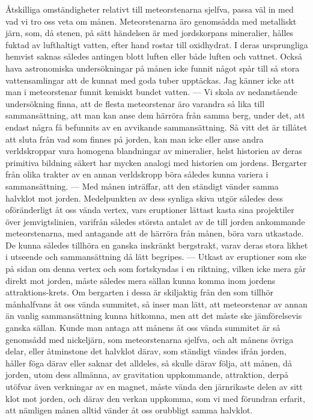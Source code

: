 \documentclass[a4paper, 12pt, oneside, swedish]{article}
\begin{document}
Åtskilliga omständigheter relativt till meteorstenarna sjelfva, passa väl in med vad vi tro oss veta om månen. Meteorstenarna äro genomsådda med metalliskt järn, som, då stenen, på sätt händelsen är med jordskorpans mineralier, hålles fuktad av lufthaltigt vatten, efter hand rostar till oxidhydrat. I deras ursprungliga hemvist saknas således antingen blott luften eller både luften och vattnet. Också hava astronomiska undersökningar på månen icke funnit något spår till så stora vattensamlingar att de kunnat med goda tuber upptäckas. Jag känner icke att man i meteorstenar funnit kemiskt bundet vatten. --- Vi skola av nedanstående undersökning finna, att de flesta meteorstenar äro varandra så lika till sammansättning, att man kan anse dem härröra från samma berg, under det, att endast några få befunnits av en avvikande sammansättning. Så vitt det är tillåtet att sluta från vad som finnes på jorden, kan man icke eller anse andra verldskroppar vara homogena blandningar av mineralier, helst historien av deras primitiva bildning säkert har mycken analogi med historien om jordens. Bergarter från olika trakter av en annan verldskropp böra således kunna variera i sammansättning. --- Med månen inträffar, att den ständigt vänder samma halvklot mot jorden. Medelpunkten av dess synliga skiva utgör således dess oföränderligt åt oss vända vertex, vars eruptioner lättast kasta sina projektiler över jemvigtslinien, varifrån således största antalet av de till jorden ankommande meteorstenarna, med antagande att de härröra från månen, böra vara utkastade. De kunna således tillhöra en ganska inskränkt bergstrakt, varav deras stora likhet i utseende och sammansättning då lätt begripes. --- Utkast av eruptioner som ske på sidan om denna vertex och som fortskyndas i en riktning, vilken icke mera går direkt mot jorden, måste således mera sällan kunna komma inom jordens attraktions-krets. Om bergarten i dessa är skiljaktig från den som tillhör månhalfvans åt oss vända summitet, så inser man lätt, att meteorstenar av annan än vanlig sammansättning kunna hitkomna, men att det måste ske jämförelsevis ganska sällan. Kunde man antaga att månens åt oss vända summitet är så genomsådd med nickeljärn, som meteorstenarna sjelfva, och alt månens övriga delar, eller åtminstone det halvklot därav, som ständigt vändes ifrån jorden, håller föga därav eller saknar det alldeles, så skulle därav följa, att månen, då jorden, utom dess allmänna, av gravitation uppkommande, attraktion, derpå utöfvar även verkningar av en magnet, måste vända den järnrikaste delen av sitt klot mot jorden, och därav den verkan uppkomma, som vi med förundran erfarit, att nämligen månen alltid vänder åt oss orubbligt samma halvklot.
\end{document}

